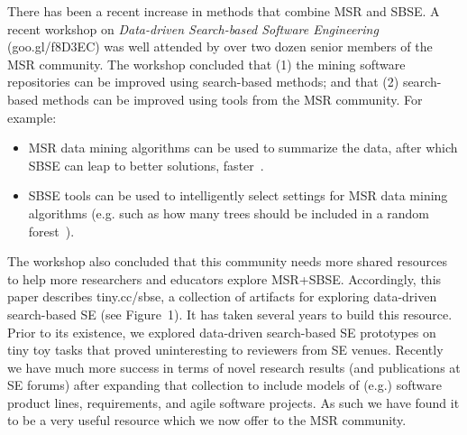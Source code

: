 \documentclass[table, xcdraw, sigconf,review, anonymous]{acmart}
\begin{document}
There has been a recent increase in methods that combine MSR and SBSE.
A recent workshop  on {\em Data-driven Search-based Software
Engineering} (goo.gl/f8D3EC)   was well attended by over two dozen senior members of the MSR community.
The workshop concluded that (1) the mining software repositories can be improved using search-based methods; and that (2) search-based methods can be improved using tools from the MSR community. 
For example:
\begin{itemize}
\item
MSR data mining algorithms can be used to summarize the data, after which SBSE can leap to better solutions, faster~\cite{krall2015gale}.
\item
SBSE tools can be used to intelligently select 
settings for MSR data mining algorithms (e.g.
such as how many trees should be included in a random
forest~\cite{fu2016tuning}).
\end{itemize}
The workshop also concluded that this community needs more shared  resources 
to help more  researchers and educators   explore MSR+SBSE.
Accordingly, this paper describes  tiny.cc/sbse,
a collection of artifacts for exploring
data-driven search-based SE (see Figure~1). 
It has    taken several years to build this resource. Prior to its
existence, we explored  data-driven search-based SE
prototypes on tiny toy tasks that proved 
uninteresting to 
 reviewers from SE venues. 
Recently we have much more success in terms of novel
research results
(and publications at SE forums) after 
expanding that collection
to include models
of (e.g.) software product lines, requirements, and
agile software projects. 
As such we have found it to be a very useful resource
which we now offer to the MSR community.






\end{document}

